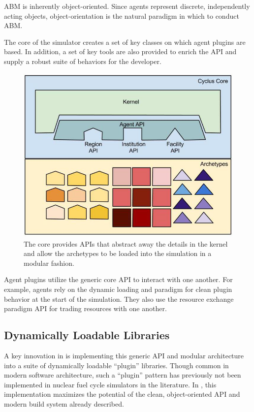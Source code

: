 \acrlong{ABM} is inherently object-oriented. Since agents represent 
discrete, independently acting objects, object-orientation is the natural 
paradigm in which to conduct \gls{ABM}.

The core of the \Cyclus simulator creates a set of key classes on which agent plugins 
are based. In addition, a set of key tools are also provided to enrich the 
\gls{API} and supply a robust suite of behaviors for the developer.


\begin{figure}[htbp!]
\begin{center}
\includegraphics[width=\textwidth]{./images/framework}
\end{center}
\caption{The \Cyclus core provides \gls{API}s that abstract away the details in 
the kernel and allow the archetypes to be loaded into the simulation in a modular 
fashion.}
\label{fig:framework}
\end{figure}

Agent plugins utilize the generic core \gls{API} to interact with one another.  For 
example, agents rely on the dynamic loading and paradigm for clean plugin 
behavior at the start of the simulation. They also use the resource exchange 
paradigm \gls{API} for trading resources with one another. 


\subsection{Dynamically Loadable Libraries}

A key innovation in \Cyclus is implementing this generic \gls{API} and modular 
architecture into a suite of dynamically loadable ``plugin'' libraries.  Though 
common in modern software architecture, such a ``plugin'' pattern has 
previously not been implemented in nuclear fuel cycle simulators in the 
literature.  In \Cyclus, this implementation maximizes the potential of the clean, 
object-oriented \gls{API} and modern build system already described.

